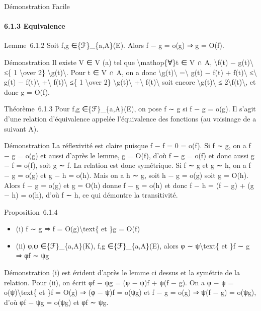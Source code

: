 \documentclass[]{article}
\begin{document}
Démonstration Facile

\paragraph{6.1.3 Equivalence}

Lemme~6.1.2 Soit f,g ∈\{ℱ\}\_\{a,A\}(E). Alors f − g = o(g) ⇒ g = O(f).

Démonstration Il existe V ∈ V (a) tel que \textbackslash{}mathop\{∀\}t ∈
V ∩ A, \textbackslash{}\textbar{}f(t) − g(t)\textbackslash{}\textbar{}
≤\{ 1 \textbackslash{}over 2\}
\textbackslash{}\textbar{}g(t)\textbackslash{}\textbar{}. Pour t ∈ V ∩
A, on a donc \textbackslash{}\textbar{}g(t)\textbackslash{}\textbar{}
=\textbackslash{}\textbar{} g(t) − f(t) + f(t)\textbackslash{}\textbar{}
≤\textbackslash{}\textbar{} g(t) − f(t)\textbackslash{}\textbar{}
+\textbackslash{}\textbar{} f(t)\textbackslash{}\textbar{} ≤\{ 1
\textbackslash{}over 2\}
\textbackslash{}\textbar{}g(t)\textbackslash{}\textbar{}
+\textbackslash{}\textbar{} f(t)\textbackslash{}\textbar{} soit encore
\textbackslash{}\textbar{}g(t)\textbackslash{}\textbar{} ≤
2\textbackslash{}\textbar{}f(t)\textbackslash{}\textbar{}, et donc g =
O(f).

Théorème~6.1.3 Pour f,g ∈\{ℱ\}\_\{a,A\}(E), on pose f ∼ g si f − g =
o(g). Il s'agit d'une relation d'équivalence appelée l'équivalence des
fonctions (au voisinage de a suivant A).

Démonstration La réflexivité est claire puisque f − f = 0 = o(f). Si f ∼
g, on a f − g = o(g) et aussi d'après le lemme, g = O(f), d'où f − g =
o(f) et donc aussi g − f = o(f), soit g ∼ f. La relation est donc
symétrique. Si f ∼ g et g ∼ h, on a f − g = o(g) et g − h = o(h). Mais
on a h ∼ g, soit h − g = o(g) soit g = O(h). Alors f − g = o(g) et g =
O(h) donne f − g = o(h) et donc f − h = (f − g) + (g − h) = o(h), d'où f
∼ h, ce qui démontre la transitivité.

Proposition~6.1.4

\begin{itemize}
\itemsep1pt\parskip0pt
\item
  (i) f ∼ g ⇒ f = O(g)\textbackslash{}text\{ et \}g = O(f)
\item
  (ii) φ,ψ ∈\{ℱ\}\_\{a,A\}(K), f,g ∈\{ℱ\}\_\{a,A\}(E), alors φ ∼
  ψ\textbackslash{}text\{ et \}f ∼ g ⇒ φf ∼ ψg
\end{itemize}

Démonstration (i) est évident d'après le lemme ci dessus et la symétrie
de la relation. Pour (ii), on écrit φf − ψg = (φ − ψ)f + ψ(f − g). On a
φ − ψ = o(ψ)\textbackslash{}text\{ et \}f = O(g) ⇒ (φ − ψ)f = o(ψg) et f
− g = o(g) ⇒ ψ(f − g) = o(ψg), d'où φf − ψg = o(ψg) et φf ∼ ψg.
\end{document}
